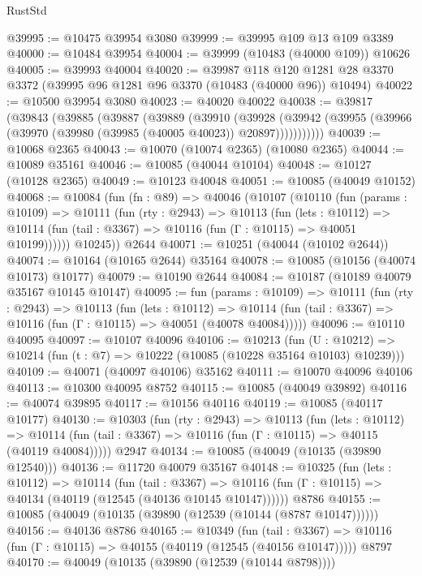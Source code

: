 \begin{lexlean}{RustStd}
\begin{coremodule}
@39995 := @10475 @39954 @3080
@39999 := @39995 @109 @13 @109 @3389
@40000 := @10484 @39954
@40004 := @39999 (@10483 (@40000 @109)) @10626
@40005 := @39993 @40004
@40020 := @39987
    @118
    @120
    @1281
    @28
    @3370
    @3372
    (@39995 @96 @1281 @96 @3370 (@10483 (@40000 @96)) @10494)
@40022 := @10500 @39954 @3080
@40023 := @40020 @40022
@40038 := @39817
    (@39843
      (@39885
        (@39887
          (@39889
            (@39910
              (@39928
                (@39942 (@39955 (@39966 (@39970 (@39980 (@39985 (@40005 @40023)) @20897)))))))))))
@40039 := @10068 @2365
@40043 := @10070 (@10074 @2365) (@10080 @2365)
@40044 := @10089 @35161
@40046 := @10085 (@40044 @10104)
@40048 := @10127 (@10128 @2365)
@40049 := @10123 @40048
@40051 := @10085 (@40049 @10152)
@40068 := @10084
    (fun (fn : @89) =>
    @40046
      (@10107
        (@10110
          (fun (params : @10109) =>
          @10111
            (fun (rty : @2943) =>
            @10113
              (fun (lets : @10112) =>
              @10114 (fun (tail : @3367) => @10116 (fun (Γ : @10115) => @40051 @10199))))))
        @10245))
    @2644
@40071 := @10251 (@40044 (@10102 @2644))
@40074 := @10164 (@10165 @2644) @35164
@40078 := @10085 (@10156 (@40074 @10173) @10177)
@40079 := @10190 @2644
@40084 := @10187 (@10189 @40079 @35167 @10145 @10147)
@40095 := fun (params : @10109) =>
  @10111
    (fun (rty : @2943) =>
    @10113
      (fun (lets : @10112) =>
      @10114 (fun (tail : @3367) => @10116 (fun (Γ : @10115) => @40051 (@40078 @40084)))))
@40096 := @10110 @40095
@40097 := @10107 @40096
@40106 := @10213
    (fun (U : @10212) => @10214 (fun (t : @7) => @10222 (@10085 (@10228 @35164 @10103) @10239)))
@40109 := @40071 (@40097 @40106) @35162
@40111 := @10070 @40096 @40106
@40113 := @10300 @40095 @8752
@40115 := @10085 (@40049 @39892)
@40116 := @40074 @39895
@40117 := @10156 @40116
@40119 := @10085 (@40117 @10177)
@40130 := @10303
    (fun (rty : @2943) =>
    @10113
      (fun (lets : @10112) =>
      @10114 (fun (tail : @3367) => @10116 (fun (Γ : @10115) => @40115 (@40119 @40084)))))
    @2947
@40134 := @10085 (@40049 (@10135 (@39890 @12540)))
@40136 := @11720 @40079 @35167
@40148 := @10325
    (fun (lets : @10112) =>
    @10114
      (fun (tail : @3367) =>
      @10116 (fun (Γ : @10115) => @40134 (@40119 (@12545 (@40136 @10145 @10147))))))
    @8786
@40155 := @10085 (@40049 (@10135 (@39890 (@12539 (@10144 (@8787 @10147))))))
@40156 := @40136 @8786
@40165 := @10349
    (fun (tail : @3367) => @10116 (fun (Γ : @10115) => @40155 (@40119 (@12545 (@40156 @10147)))))
    @8797
@40170 := @40049 (@10135 (@39890 (@12539 (@10144 @8798))))

\end{coremodule}
\end{lexlean}
